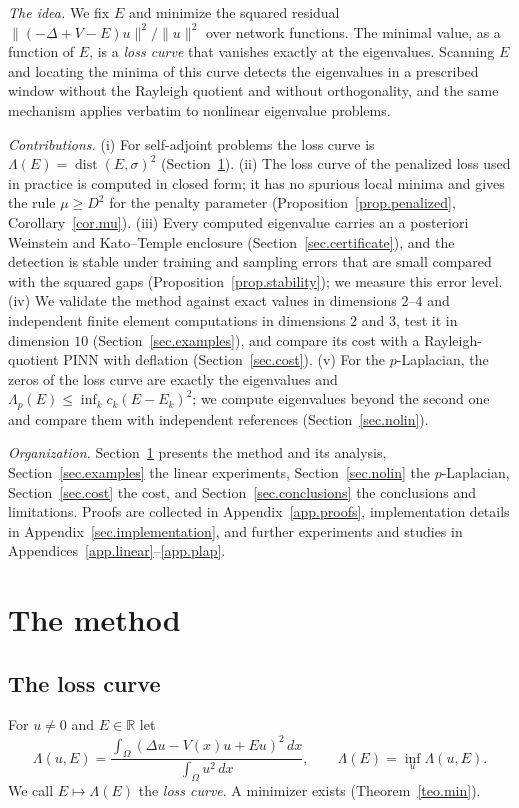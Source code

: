 \documentclass[10pt]{amsart}
\theoremstyle{definition}
\theoremstyle{remark}
\theoremstyle{plain}
\newcommand{\R}{\mathbb{R}}
\DeclareMathOperator{\dist}{dist}
\begin{document}
\emph{The idea.} We fix $E$ and minimize the squared residual $\|(-\Delta+V-E)u\|^2/\|u\|^2$ over
network functions. The minimal value, as a function of $E$, is a \emph{loss curve} that vanishes
exactly at the eigenvalues. Scanning $E$ and locating the minima of this curve detects the
eigenvalues in a prescribed window without the Rayleigh quotient and without orthogonality, and the
same mechanism applies verbatim to nonlinear eigenvalue problems.

\emph{Contributions.} (i) For self-adjoint problems the loss curve is $\Lambda(E)=\dist(E,\sigma)^2$
(Section~\ref{sec.approach}). (ii) The loss curve of the penalized loss used in practice is computed in
closed form; it has no spurious local minima and gives the rule $\mu\ge D^2$ for the penalty parameter
(Proposition~\ref{prop.penalized}, Corollary~\ref{cor.mu}). (iii) Every computed eigenvalue carries an
a posteriori Weinstein and Kato--Temple enclosure (Section~\ref{sec.certificate}), and the detection is
stable under training and sampling errors that are small compared with the squared gaps
(Proposition~\ref{prop.stability}); we measure this error level. (iv) We validate the method against
exact values in dimensions $2$--$4$ and independent finite element computations in
dimensions $2$ and $3$, test it in
dimension $10$ (Section~\ref{sec.examples}), and compare its cost with a Rayleigh-quotient PINN with
deflation (Section~\ref{sec.cost}). (v) For the $p$-Laplacian, the zeros of the loss curve are exactly
the eigenvalues and $\Lambda_p(E)\le\inf_kc_k(E-E_k)^2$; we compute eigenvalues beyond the second
one and compare them with independent references (Section~\ref{sec.nolin}).

\emph{Organization.} Section~\ref{sec.approach} presents the method and its analysis,
Section~\ref{sec.examples} the linear experiments, Section~\ref{sec.nolin} the $p$-Laplacian,
Section~\ref{sec.cost} the cost, and Section~\ref{sec.conclusions} the conclusions and limitations.
Proofs are collected in Appendix~\ref{app.proofs}, implementation details in
Appendix~\ref{sec.implementation}, and further experiments and studies in
Appendices~\ref{app.linear}--\ref{app.plap}.

\section{The method}\label{sec.approach}

\subsection{The loss curve}
For $u\ne0$ and $E\in\R$ let
\begin{equation}\label{Lambda}
\Lambda(u, E) = \frac{\int_{\Omega} (\Delta u - V(x) u + Eu)^2\, dx}{\int_{\Omega} u^2\, dx},
\qquad
\Lambda(E) = \inf_u \Lambda(u, E).
\end{equation}
We call $E\mapsto\Lambda(E)$ the \emph{loss curve}. A minimizer exists (Theorem~\ref{teo.min}).
\end{document}
